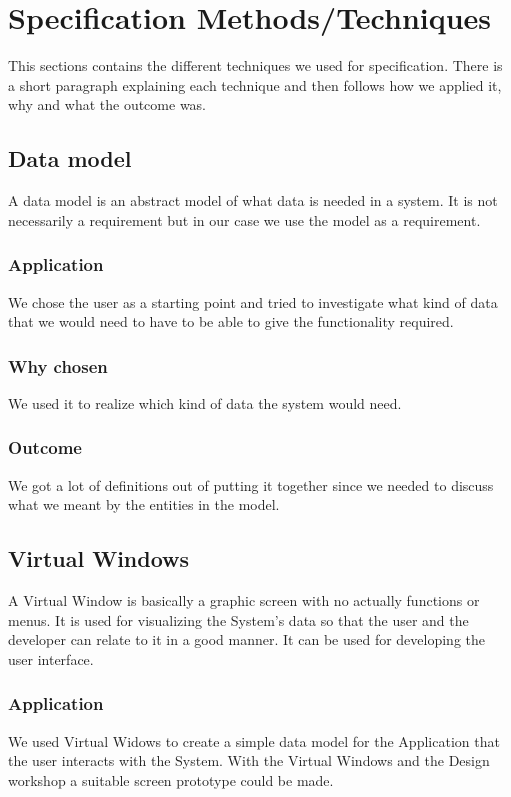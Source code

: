 \documentclass[a4paper]{article}
\begin{document}
	\section{Specification Methods/Techniques}
This sections contains the different techniques we used for specification. There is a short paragraph explaining each technique and then follows how we applied it, why and what the outcome was.

		\subsection{Data model}
A data model is an abstract model of what data is needed in a system. It is not necessarily a requirement but in our case we use the model as a requirement.
	
		\subsubsection{Application}
		We chose the user as a starting point and tried to investigate what kind of data that we would need to have to be able to give the functionality required.
		\subsubsection{Why chosen}
		We used it to realize which kind of data the system would need.
		\subsubsection{Outcome}
	We got a lot of definitions out of putting it together since we needed to discuss what we meant by the entities in the model.

		\subsection{Virtual Windows}
			A Virtual Window is basically a graphic screen with no actually functions or menus. It is used for visualizing the System's data so that the user and the developer can relate to it in a good manner. It can be used for developing the user interface.
			\subsubsection{Application}
				We used Virtual Widows to create a simple data model for the Application that the user interacts with the System. With the Virtual Windows and the Design workshop a suitable screen prototype could be made.
\end{document}
